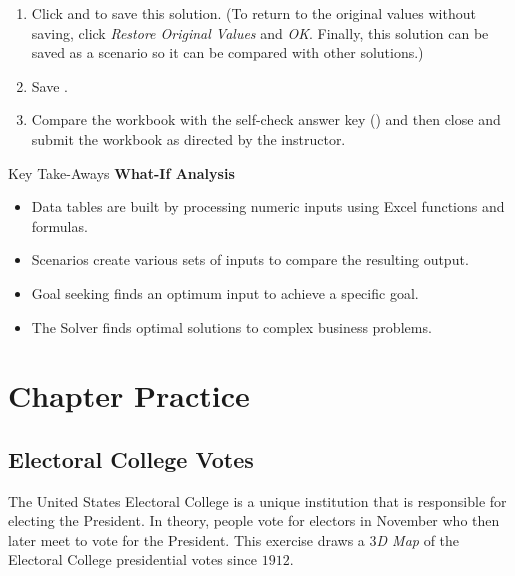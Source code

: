 \begin{enumbox}
	\begin{enumerate}
		\item Click  and  to save this solution. (To return to the original values without saving, click \textit{Restore Original Values} and \textit{OK}. Finally, this solution can be saved as a scenario so it can be compared with other solutions.)
		\item Save .
		\item Compare the workbook with the self-check answer key () and then close and submit the  workbook as directed by the instructor.
	\end{enumerate}
\end{enumbox}

\begin{center}
	\begin{tkwbox}{Key Take-Aways}
		\textbf{What-If Analysis}
		\\
		\begin{itemize}
			\setlength{\itemsep}{0pt}
			\setlength{\parskip}{0pt}
			\setlength{\parsep}{0pt}
			
			\item Data tables are built by processing numeric inputs using Excel functions and formulas.
			\item Scenarios create various sets of inputs to compare the resulting output.
			\item Goal seeking finds an optimum input to achieve a specific goal.
			\item The Solver finds optimal solutions to complex business problems.
			
		\end{itemize}
	\end{tkwbox}
\end{center}

\section{Chapter Practice}

\subsection{Electoral College Votes}

The United States Electoral College is a unique institution that is responsible for electing the President. In theory, people vote for electors in November who then later meet to vote for the President. This exercise draws a \textit{$ 3 $D Map} of the Electoral College presidential votes since $ 1912 $.

